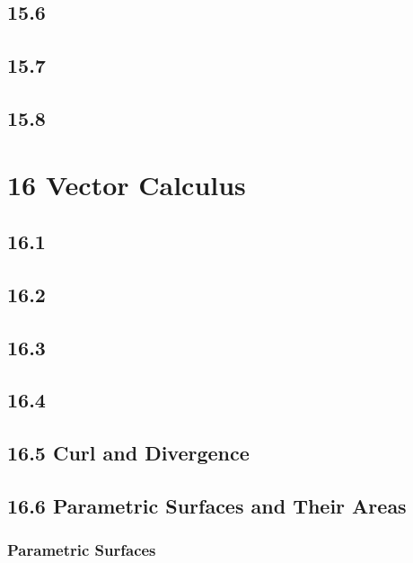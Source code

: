 \documentclass{report}
\begin{document}
\section*{15.6}

\section*{15.7}

\section*{15.8}

\chapter*{16 Vector Calculus}

\section*{16.1}

\section*{16.2}

\section*{16.3}

\section*{16.4}

\section*{16.5 Curl and Divergence}

\section*{16.6 Parametric Surfaces and Their Areas}

\subsection*{Parametric Surfaces}
\end{document}
